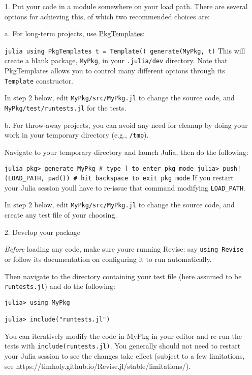\begin{itemize}
\item[1. ] Put your code in a module somewhere on your load path. There are several options for achieving this, of which two recommended choices are:

a. For long-term projects, use    \href{https://github.com/invenia/PkgTemplates.jl}{PkgTemplates}:

\texttt{julia    using PkgTemplates    t = Template()    generate({\textquotedbl}MyPkg{\textquotedbl}, t)}    This will create a blank package, \texttt{{\textquotedbl}MyPkg{\textquotedbl}}, in your \texttt{.julia/dev} directory.    Note that PkgTemplates allows you to control many different options    through its \texttt{Template} constructor.

In step 2 below, edit \texttt{MyPkg/src/MyPkg.jl} to change the source code, and    \texttt{MyPkg/test/runtests.jl} for the tests.

b. For {\textquotedbl}throw-away{\textquotedbl} projects, you can avoid any need for cleanup    by doing your work in your temporary directory (e.g., \texttt{/tmp}).

Navigate to your temporary directory and launch Julia, then do the following:

\texttt{julia    pkg> generate MyPkg              \# type ] to enter pkg mode    julia> push!(LOAD\_PATH, pwd())   \# hit backspace to exit pkg mode}    If you restart your Julia session you{\textquotesingle}ll have to re-issue that command    modifying \texttt{LOAD\_PATH}.

In step 2 below, edit \texttt{MyPkg/src/MyPkg.jl} to change the source code, and create any    test file of your choosing.


\item[2. ] Develop your package

\emph{Before} loading any code, make sure you{\textquotesingle}re running Revise: say \texttt{using Revise} or follow its documentation on configuring it to run automatically.

Then navigate to the directory containing your test file (here assumed to be \texttt{{\textquotedbl}runtests.jl{\textquotedbl}}) and do the following:


\begin{verbatim}
julia> using MyPkg

julia> include("runtests.jl")
\end{verbatim}

You can iteratively modify the code in MyPkg in your editor and re-run the tests with \texttt{include({\textquotedbl}runtests.jl{\textquotedbl})}.  You generally should not need to restart your Julia session to see the changes take effect (subject to a few limitations, see https://timholy.github.io/Revise.jl/stable/limitations/).

\end{itemize}


